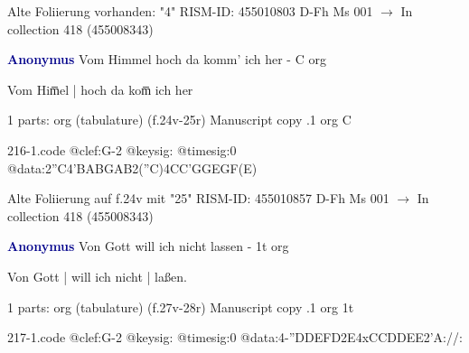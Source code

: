 \documentclass[twocolumn]{book}
\begin{document}
\newline Alte Foliierung vorhanden: "4"
\newline RISM-ID: 455010803
\newline D-Fh  Ms 001
\newline $\rightarrow$ In collection 418 (455008343)
      
\newline \par \vspace{7pt} \textcolor{darkblue}{\textbf{Anonymus  }}
\newline Vom Himmel hoch da komm' ich her - C
\newline org
\newline \begin{itshape}[f.24v, at left:] Vom Him̅el | hoch da kom̅ ich her\end{itshape} 
\newline \textcolor{darkblue}{}  1 parts: org (tabulature)  (f.24v-25r)
\newline Manuscript copy
.1  org  C  
\begin{filecontents*}{216-1.code}
@clef:G-2
@keysig:
@timesig:0
@data:2''C4'BABGAB2(''C)4CC'GGEGF(E)
\end{filecontents*}
\newline
%

\newline Alte Foliierung auf f.24v mit "25"
\newline RISM-ID: 455010857
\newline D-Fh  Ms 001
\newline $\rightarrow$ In collection 418 (455008343)
      
\newline \par \vspace{7pt} \textcolor{darkblue}{\textbf{Anonymus  }}
\newline Von Gott will ich nicht lassen - 1t
\newline org
\newline \begin{itshape}[f.27v, at left:] Von Gott | will ich nicht | laßen.\end{itshape} 
\newline \textcolor{darkblue}{}  1 parts: org (tabulature)  (f.27v-28r)
\newline Manuscript copy
.1  org  1t  
\begin{filecontents*}{217-1.code}
@clef:G-2
@keysig:
@timesig:0
@data:4-''DDEFD2E4xCCDDEE2'A://:
\end{filecontents*}
\newline
%
\end{document}
